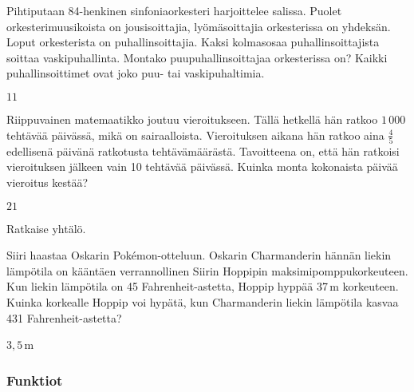 \begin{tehtava}
	Pihtiputaan 84-henkinen sinfoniaorkesteri harjoittelee salissa. Puolet orkesterimuusikoista on jousisoittajia, lyömäsoittajia orkesterissa on yhdeksän. Loput orkesterista on puhallinsoittajia. Kaksi kolmasosaa puhallinsoittajista soittaa vaskipuhallinta. Montako puupuhallinsoittajaa orkesterissa on? Kaikki puhallinsoittimet ovat joko puu- tai vaskipuhaltimia.
\begin{vastaus}
	$11$
\end{vastaus}
\end{tehtava}

\begin{tehtava}
	Riippuvainen matemaatikko joutuu vieroitukseen. Tällä hetkellä hän ratkoo $1\,000$ tehtävää päivässä, mikä on sairaalloista. Vieroituksen aikana hän ratkoo aina $\frac{4}{5}$ edellisenä päivänä ratkotusta tehtävämäärästä. Tavoitteena on, että hän ratkoisi vieroituksen jälkeen vain 10 tehtävää päivässä. Kuinka monta kokonaista päivää vieroitus kestää?
\begin{vastaus}
	$21$
\end{vastaus}
\end{tehtava}

\begin{tehtava}
	Ratkaise yhtälö.
	

\begin{vastaus}
\end{vastaus}
\end{tehtava}

\begin{tehtava}
	Siiri haastaa Oskarin Pokémon-otteluun. Oskarin Charmanderin hännän liekin lämpötila on kääntäen verrannollinen Siirin Hoppipin maksimipomppukorkeuteen. Kun liekin lämpötila on 45 Fahrenheit-astetta, Hoppip hyppää 37\,m korkeuteen. Kuinka korkealle Hoppip voi hypätä, kun Charmanderin liekin lämpötila kasvaa 431 Fahrenheit-astetta?
	

\begin{vastaus}
	$3,5$\,m
\end{vastaus}
\end{tehtava}



\subsubsection*{Funktiot}

